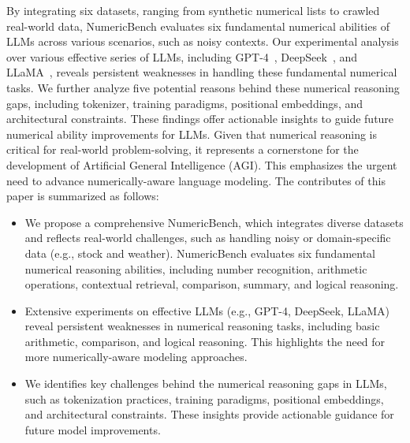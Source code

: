 By integrating six datasets, ranging from synthetic numerical lists to crawled real-world data, NumericBench evaluates six fundamental numerical abilities of LLMs across various scenarios, such as noisy contexts.
Our experimental analysis over various effective series of LLMs, including 
GPT-4~\citep{achiam2023gpt}, 
DeepSeek~\citep{liu2024deepseek}, 
and LLaMA~\citep{touvron2023llama}, 
reveals persistent weaknesses in handling these fundamental numerical tasks. 
We further analyze five potential reasons behind these numerical reasoning gaps, including tokenizer, training paradigms, positional embeddings, and architectural constraints. 
These findings offer actionable insights to guide future  numerical ability improvements for LLMs. 
Given that numerical reasoning is critical for real-world problem-solving, it represents a cornerstone for the development of Artificial General Intelligence (AGI). 
This emphasizes the urgent need to advance numerically-aware language modeling.
 The contributes of this paper is summarized as follows:
\begin{itemize}[leftmargin=*]
	\item 
	We propose a comprehensive NumericBench, which integrates diverse datasets and reflects real-world challenges, such as handling noisy or domain-specific data (e.g., stock and weather).
	NumericBench evaluates six fundamental numerical reasoning abilities, including number recognition, arithmetic operations, 
	contextual retrieval, comparison, summary, and logical reasoning. 


	\item  Extensive experiments on effective LLMs (e.g., GPT-4, DeepSeek, LLaMA) reveal persistent weaknesses in numerical reasoning tasks, including basic arithmetic, comparison, and logical reasoning. This highlights the need for more numerically-aware modeling approaches.
	
	
	\item We identifies key challenges behind the numerical reasoning gaps in LLMs, such as tokenization practices, training paradigms, positional embeddings, and architectural constraints. These insights provide actionable guidance for future model improvements.
	
\end{itemize}





